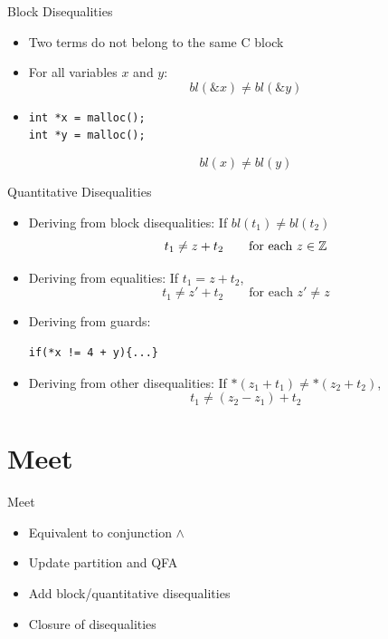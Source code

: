 \documentclass{beamer}
\begin{document}
\begin{frame}[containsverbatim]{Block Disequalities}
    \begin{itemize}
        \item Two terms do not belong to the same C block
        \item For all variables $x$ and $y$:
              \[
                  bl(\&x) \neq bl(\&y)
              \]
        \item
              \begin{verbatim}
int *x = malloc();
int *y = malloc();
\end{verbatim}

              \[
                  bl(x) \neq bl(y)
              \]

    \end{itemize}
\end{frame}

\begin{frame}[containsverbatim]{Quantitative Disequalities}
    \begin{itemize}
        \item Deriving from block disequalities: If $bl(t_1) \neq bl(t_2)$
              \[
                  t_1\neq z+ t_2 \quad\quad \text{for each $z \in \mathbb{Z}$}
              \]
        \item Deriving from equalities: If $t_1 = z + t_2$,
              \[
                  t_1\neq z' + t_2 \quad\quad \text{for each $z' \neq z$}
              \]

        \item Deriving from guards:
              \begin{verbatim}
if(*x != 4 + y){...}
\end{verbatim}
        \item Deriving from other disequalities: If $*(z_1 + t_1) \neq *(z_2 + t_2)$,
              \[ t_1 \neq (z_2 - z_1) + t_2
              \]
    \end{itemize}
\end{frame}

\section{Meet}
\begin{frame}{Meet}
    \begin{itemize}

        \item Equivalent to conjunction $\land$
        \item Update partition and QFA
        \item Add block/quantitative disequalities
        \item Closure of disequalities

    \end{itemize}
\end{frame}
\end{document}
